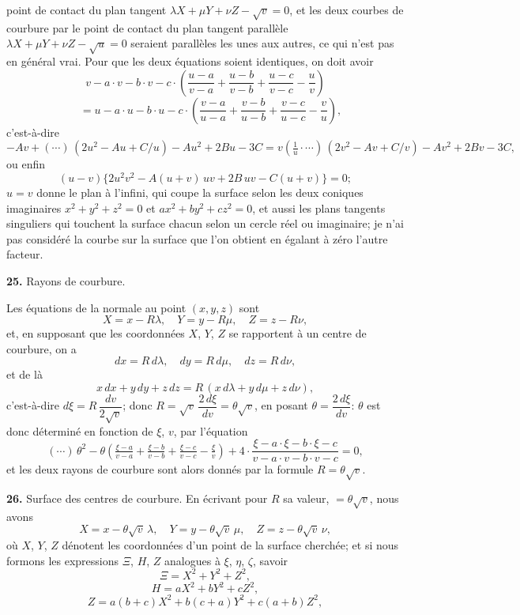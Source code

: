 \documentclass[11pt,a4paper]{article}
\begin{document}
point de contact du plan tangent $\lambda X + \mu Y + \nu Z - \sqrt{v} = 0$, et les deux courbes de courbure par le point de contact du plan tangent parall\`ele $\lambda X + \mu Y + \nu Z - \sqrt{u} = 0$ seraient parall\`eles les unes aux autres, ce qui n'est pas en g\'en\'eral vrai. Pour que les deux \'equations soient identiques, on doit avoir
\[
v - a\cdot v - b\cdot v - c\cdot\!\left(\frac{u - a}{v - a} + \frac{u - b}{v - b} + \frac{u - c}{v - c} - \frac{u}{v}\right)
\]
\[
\quad = u - a\cdot u - b\cdot u - c\cdot\!\left(\frac{v - a}{u - a} + \frac{v - b}{u - b} + \frac{v - c}{u - c} - \frac{v}{u}\right),
\]
c'est-\`a-dire
\[
- A v + (\cdots)\,(2 u^2 - A u + C/u) - A u^2 + 2 B u - 3 C = v\!\left(\tfrac{1}{u}\cdot\cdots\right)\,(2 v^2 - A v + C/v) - A v^2 + 2 B v - 3 C,
\]
ou enfin
\[
(u - v)\{2 u^2 v^2 - A(u + v)\,u v + 2 B\,u v - C(u + v)\} = 0;
\]
$u = v$ donne le plan \`a l'infini, qui coupe la surface selon les deux coniques imaginaires $x^2 + y^2 + z^2 = 0$ et $a x^2 + b y^2 + c z^2 = 0$, et aussi les plans tangents singuliers qui touchent la surface chacun selon un cercle r\'eel ou imaginaire; je n'ai pas consid\'er\'e la courbe sur la surface que l'on obtient en \'egalant \`a z\'ero l'autre facteur.

\textbf{25.} Rayons de courbure.

Les \'equations de la normale au point $(x, y, z)$ sont
\[
X = x - R\lambda,\quad Y = y - R\mu,\quad Z = z - R\nu,
\]
et, en supposant que les coordonn\'ees $X$, $Y$, $Z$ se rapportent \`a un centre de courbure, on a
\[
dx = R\,d\lambda,\quad dy = R\,d\mu,\quad dz = R\,d\nu,
\]
et de l\`a
\[
x\,dx + y\,dy + z\,dz = R\,(x\,d\lambda + y\,d\mu + z\,d\nu),
\]
c'est-\`a-dire $d\xi = R\,\dfrac{dv}{2\sqrt{v}}$; donc $R = \sqrt{v}\,\dfrac{2\,d\xi}{dv} = \theta\sqrt{v}$, en posant $\theta = \dfrac{2\,d\xi}{dv}$: $\theta$ est donc d\'etermin\'e en fonction de $\xi$, $v$, par l'\'equation
\[
(\cdots)\,\theta^2 - \theta\!\left(\tfrac{\xi - a}{v - a} + \tfrac{\xi - b}{v - b} + \tfrac{\xi - c}{v - c} - \tfrac{\xi}{v}\right) + 4\cdot\frac{\xi - a\cdot\xi - b\cdot\xi - c}{v - a\cdot v - b\cdot v - c} = 0,
\]
et les deux rayons de courbure sont alors donn\'es par la formule $R = \theta\sqrt{v}$.

\textbf{26.} Surface des centres de courbure. En \'ecrivant pour $R$ sa valeur, $=\theta\sqrt{v}$, nous avons
\[
X = x - \theta\sqrt{v}\,\lambda,\quad Y = y - \theta\sqrt{v}\,\mu,\quad Z = z - \theta\sqrt{v}\,\nu,
\]
o\`u $X$, $Y$, $Z$ d\'enotent les coordonn\'ees d'un point de la surface cherch\'ee; et si nous formons les expressions $\Xi$, $H$, $Z$ analogues \`a $\xi$, $\eta$, $\zeta$, savoir
\[
\Xi = X^2 + Y^2 + Z^2,
\]
\[
H = a X^2 + b Y^2 + c Z^2,
\]
\[
Z = a(b + c) X^2 + b(c + a) Y^2 + c(a + b) Z^2,
\]
\end{document}
